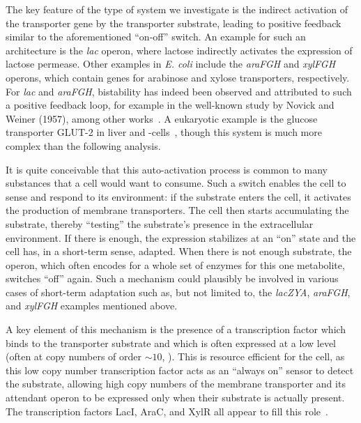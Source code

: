 \documentclass[10pt,letterpaper]{article}
\begin{document}
	The key feature of the type of system we investigate is the indirect activation of
	the transporter gene by the transporter substrate, leading to positive
	feedback similar to the aforementioned ``on-off'' switch. An example for
	such an architecture is the \emph{lac} operon, where lactose indirectly
	activates the expression of lactose permease. Other examples in \emph{E.
		coli} include the \emph{araFGH} and \emph{xylFGH} operons, which contain genes for
	arabinose and xylose transporters, respectively. For \emph{lac} and
	\emph{araFGH}, bistability has indeed been observed and attributed to such a
	positive feedback
	loop, for example in the well-known study by Novick and Weiner (1957),
	among other works~\cite{Novick1957,Santillan2008,Ozbudak2004,Narang2008,Choi2008,Fritz2014,Jenkins2017,Siegele1997}.
	A eukaryotic example is the glucose transporter GLUT-2 in liver and
	\textbeta-cells~\cite{Bae2010,Tiedge1991}, though this system is much more
	complex than the following analysis.
	
	It is quite conceivable that this auto-activation process is common to many
	substances that a cell would want to consume. Such a switch enables the
	cell to sense and respond to its environment: if the substrate enters the
	cell, it activates the production of membrane transporters. The cell then
	starts accumulating the substrate, thereby ``testing'' the substrate's
	presence in the extracellular environment. If there is enough, the
	expression stabilizes at an ``on'' state and the cell has, in a short-term
	sense, adapted. When there is not enough substrate, the operon, which
	often encodes for a whole set of enzymes for this one metabolite, switches
	``off'' again. Such a mechanism could plausibly be involved in various cases of
	short-term adaptation such as, but not limited to, the \emph{lacZYA}, \emph{araFGH},
	and \emph{xylFGH} examples mentioned above.
	
	A key element of this mechanism is the presence of a transcription factor
	which binds to the transporter substrate and which is often expressed at a low level (often at copy numbers
	of order $\sim10$, \cite{Schmidt2015, Li2014}).
	This is resource efficient for the cell, as this low copy number
	transcription factor acts as an ``always on'' sensor to detect
	the substrate, allowing high copy numbers of the membrane transporter
	and its attendant operon to be expressed only when
	their substrate is actually present. The transcription factors
	LacI, AraC, and XylR all appear to fill this
	role~\cite{Novick1957,Santillan2008,Ozbudak2004,Narang2008,Choi2008,Fritz2014,Jenkins2017,Siegele1997,Song1997,Schmidt2015}.
	
\end{document}
